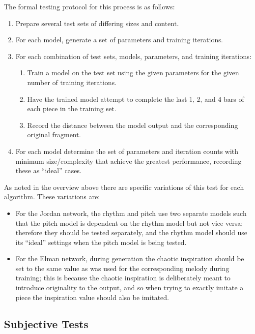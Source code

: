 \documentclass[ author={Stephen Livermore-Tozer},
				supervisor={Dr. Peter Flach},
				degree={MEng},
				title={Algorithmic Co-composition Using Machine Learning},
				subtitle={},
				type={research},
				year={2016} ]{dissertation}
\begin{document}
	The formal testing protocol for this process is as follows:
	\begin{enumerate}
		\item Prepare several test sets of differing sizes and content.
		\item For each model, generate a set of parameters and training iterations.
		\item For each combination of test sets, models, parameters, and training iterations:
		\begin{enumerate}
			\item Train a model on the test set using the given parameters for the given number of training iterations.
			\item Have the trained model attempt to complete the last 1, 2, and 4 bars of each piece in the training set.
			\item Record the distance between the model output and the corresponding original fragment.
		\end{enumerate}
		\item For each model determine the set of parameters and iteration counts with minimum size/complexity that achieve the greatest performance, recording these as ``ideal'' cases.
	\end{enumerate}
	
	As noted in the overview above there are specific variations of this test for each algorithm. These variations are:
	\begin{itemize}
		\item For the Jordan network, the rhythm and pitch use two separate models such that the pitch model is dependent on the rhythm model but not vice versa; therefore they should be tested separately, and the rhythm model should use its ``ideal'' settings when the pitch model is being tested.
		\item For the Elman network, during generation the chaotic inspiration should be set to the same value as was used for the corresponding melody during training; this is because the chaotic inspiration is deliberately meant to introduce originality to the output, and so when trying to exactly imitate a piece the inspiration value should also be imitated.
	\end{itemize}
	
	\subsection{Subjective Tests}
	\label{sec:subjective-analysis}
	
\end{document}
